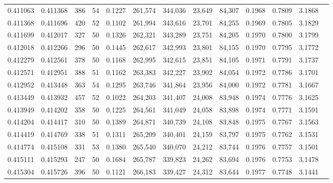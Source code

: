\begin{tabular}{rrrrrrrrrrrrr}
0.411063 & 0.411368 &   386 &  54 &                                     0.1227 & 261,574 & 344,036 &  23,649 &  84,307 & 0.1968 & 0.7809 & 3.1868 \\
0.411368 & 0.411696 &   420 &  52 &                                     0.1102 & 261,994 & 343,616 &  23,701 &  84,255 & 0.1969 & 0.7805 & 3.1829 \\
0.411699 & 0.412017 &   327 &  50 &                                     0.1326 & 262,321 & 343,289 &  23,751 &  84,205 & 0.1970 & 0.7800 & 3.1799 \\
0.412018 & 0.412266 &   296 &  50 &                                     0.1445 & 262,617 & 342,993 &  23,801 &  84,155 & 0.1970 & 0.7795 & 3.1772 \\
0.412279 & 0.412561 &   378 &  50 &                                     0.1168 & 262,995 & 342,615 &  23,851 &  84,105 & 0.1971 & 0.7791 & 3.1737 \\
0.412571 & 0.412951 &   388 &  51 &                                     0.1162 & 263,383 & 342,227 &  23,902 &  84,054 & 0.1972 & 0.7786 & 3.1701 \\
0.412952 & 0.413448 &   363 &  54 &                                     0.1295 & 263,746 & 341,864 &  23,956 &  84,000 & 0.1972 & 0.7781 & 3.1667 \\
0.413449 & 0.413932 &   457 &  52 &                                     0.1022 & 264,203 & 341,407 &  24,008 &  83,948 & 0.1974 & 0.7776 & 3.1625 \\
0.413949 & 0.414202 &   358 &  50 &                                     0.1225 & 264,561 & 341,049 &  24,058 &  83,898 & 0.1974 & 0.7771 & 3.1591 \\
0.414204 & 0.414417 &   310 &  50 &                                     0.1389 & 264,871 & 340,739 &  24,108 &  83,848 & 0.1975 & 0.7767 & 3.1563 \\
0.414419 & 0.414769 &   338 &  51 &                                     0.1311 & 265,209 & 340,401 &  24,159 &  83,797 & 0.1975 & 0.7762 & 3.1531 \\
0.414774 & 0.415108 &   331 &  53 &                                     0.1380 & 265,540 & 340,070 &  24,212 &  83,744 & 0.1976 & 0.7757 & 3.1501 \\
0.415111 & 0.415293 &   247 &  50 &                                     0.1684 & 265,787 & 339,823 &  24,262 &  83,694 & 0.1976 & 0.7753 & 3.1478 \\
0.415304 & 0.415726 &   396 &  50 &                                     0.1121 & 266,183 & 339,427 &  24,312 &  83,644 & 0.1977 & 0.7748 & 3.1441 \\

\end{tabular}
